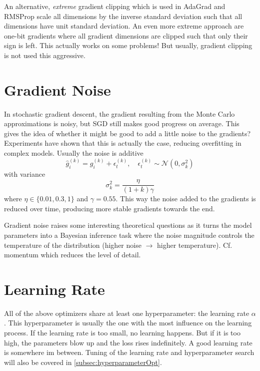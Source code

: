 		An alternative, \emph{extreme} gradient clipping which is used in AdaGrad and RMSProp scale all dimensions by the inverse standard deviation such that all dimensions have unit standard deviation. An even more extreme approach are one-bit gradients where all gradient dimensions are clipped such that only their sign is left. This actually works on some problems! But usually, gradient clipping is not used this aggressive.

	\section{Gradient Noise}
		In stochastic gradient descent, the gradient resulting from the Monte Carlo approximations is noisy, but SGD still makes good progress on average. This gives the idea of whether it might be good to add a little noise to the gradients? Experiments have shown that this is actually the case, reducing overfitting in complex models. Usually the noise is additive
		\begin{equation}
			\hat{g}_i^{(k)} = g_i^{(k)} + \epsilon_t^{(k)},\quad \epsilon_t^{(k)} \sim \mathcal{N}(0, \sigma_k^2)
		\end{equation}
		with variance
		\begin{equation}
			\sigma_k^2 = \frac{\eta}{(1 + k) \gamma}
		\end{equation}
		where \( \eta \in \{ 0.01, 0.3, 1 \} \) and \( \gamma = 0.55 \). This way the noise added to the gradients is reduced over time, producing more stable gradients towards the end.

		Gradient noise raises some interesting theoretical questions as it turns the model parameters into a Bayesian inference task where the noise magnitude controls the temperature of the distribution (higher noise \(\to\) higher temperature). Cf. momentum which reduces the level of detail.

	\section{Learning Rate}
		All of the above optimizers share at least one hyperparameter: the learning rate \(\alpha\). This hyperparameter is usually the one with the most influence on the learning process. If the learning rate is too small, no learning happens. But if it is too high, the parameters blow up and the loss rises indefinitely. A good learning rate is somewhere im between. Tuning of the learning rate and hyperparameter search will also be covered in \autoref{subsec:hyperparameterOpt}.

